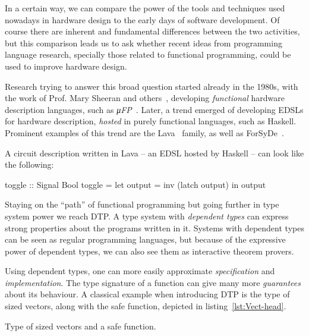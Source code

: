     In a certain way, we can compare the power of the tools and techniques
    used nowadays in hardware design to the early days of software development.
    Of course there are inherent and fundamental differences between the two activities, but
    this comparison leads us to ask whether recent ideas from programming language research,
    specially those related to functional programming, could be used to improve hardware design.

    Research trying to answer this broad question started already in the 1980s,
    with the work of Prof. Mary Sheeran and others~\cite{sheeran-survey},
    developing \emph{functional} hardware description languages, such as \emph{μFP}~\cite{mufp-1984}.
    Later, a trend emerged of developing \acp{EDSL} for hardware description,
    \emph{hosted} in purely functional languages, such as Haskell.
    Prominent examples of this trend are the Lava~\cite{lava-1999} family,
    as well as ForSyDe~\cite{forsyde1999}.

    A circuit description written in Lava -- an \ac{EDSL} hosted by Haskell -- can look like the following:

    \begin{haskellcode}
        toggle :: Signal Bool
        toggle = let output = inv (latch output) in output
    \end{haskellcode}

    Staying on the ``path'' of functional programming but going further in type system power we reach \ac{DTP}.
    A type system with \emph{dependent types} can express strong properties about the programs written in it.
    Systems with dependent types can be seen as regular programming languages,
    but because of the expressive power of dependent types, we can also see them as interactive theorem provers.

    Using dependent types, one can more easily approximate \emph{specification} and \emph{implementation}.
    The type signature of a function can give many more \emph{guarantees} about its behaviour.
    A classical example when introducing \ac{DTP} is the type of sized vectors,
    along with the safe  function, depicted in listing~\ref{lst:Vect-head}.

    \begin{listing}[h]
        \caption{Type of sized vectors and a safe  function. \label{lst:Vect-head}}
    \end{listing}

